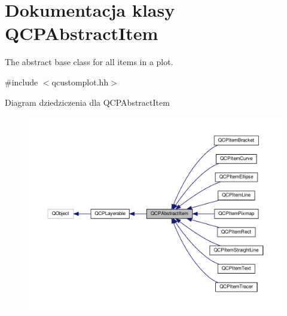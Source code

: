 \hypertarget{class_q_c_p_abstract_item}{}\section{Dokumentacja klasy Q\+C\+P\+Abstract\+Item}
\label{class_q_c_p_abstract_item}


The abstract base class for all items in a plot.  




{\ttfamily \#include $<$qcustomplot.\+hh$>$}



Diagram dziedziczenia dla Q\+C\+P\+Abstract\+Item\nopagebreak
\begin{figure}[H]
\begin{center}
\leavevmode
\includegraphics[width=350pt]{class_q_c_p_abstract_item__inherit__graph}
\end{center}
\end{figure}


